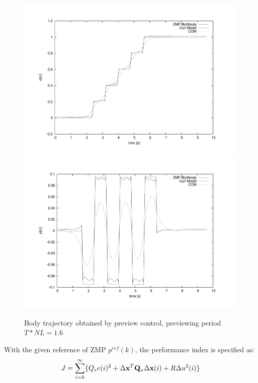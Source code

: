 \begin{figure}[htb]
\begin{center}
\includegraphics[width=\linewidth]{./figures/PatternGenerator/SecondFigureZMPMB_X}
\includegraphics[width=\linewidth]{./figures/PatternGenerator/SecondFigureZMPMB_Y}
\caption{Body trajectory obtained by preview control, previewing period $T * NL = 1.6$ }
\label{pic:ZMPMB}
\end{center}
\end{figure}
\clearpage
With the given reference of ZMP $p^{ref}(k)$, the performance
index is specified as:
\begin{equation}
J = \sum^{\infty}_{i=k} \{ Q_ee(i)^2 + \Delta{\bf x}^T {\bf Q}_x \Delta{\bf x}(i) +
R \Delta u^2(i) \}
\label{eq:PerformanceIndex1}
\end{equation}

